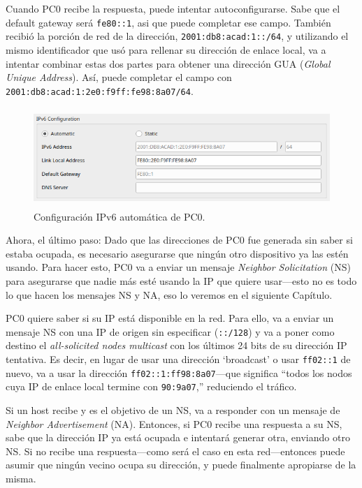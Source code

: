 \documentclass[a4paper,10pt]{corsage}
\newcommand{\ipaddress}[1]{\texttt{#1}}
\newcommand{\devname}[1]{\textsc{#1}}
\begin{document}
	Cuando \devname{PC0} recibe la respuesta, puede intentar autoconfigurarse.  Sabe que el default gateway será \ipaddress{fe80::1}, asi que puede completar ese campo.  También recibió la porción de red de la dirección, \ipaddress{2001:db8:acad:1::/64}, y utilizando el mismo identificador que usó para rellenar su dirección de enlace local, va a intentar combinar estas dos partes para obtener una dirección GUA (\textit{Global Unique Address}).  Así, puede completar el campo con \ipaddress{2001:db8:acad:1:2e0:f9ff:fe98:8a07/64}.

	\begin{figure}
		\centering
		\includegraphics[height=3.75cm]{host-automatic-conf}
		\caption{Configuración IPv6 automática de \devname{PC0}.}
	\end{figure}

	Ahora, el último paso:  Dado que las direcciones de \devname{PC0} fue generada sin saber si estaba ocupada, es necesario asegurarse que ningún otro dispositivo ya las estén usando.  Para hacer esto, \devname{PC0} va a enviar un mensaje \textit{Neighbor Solicitation} (NS) para asegurarse que nadie más esté usando la IP que quiere usar---esto no es todo lo que hacen los mensajes NS y NA, eso lo veremos en el siguiente Capítulo.

	\devname{PC0} quiere saber si su IP está disponible en la red.  Para ello, va a enviar un mensaje NS con una IP de origen sin especificar (\ipaddress{::/128}) y va a poner como destino el \textit{all-solicited nodes multicast} con los últimos 24 bits de su dirección IP tentativa.  Es decir, en lugar de usar una dirección `broadcast' o usar \ipaddress{ff02::1} de nuevo, va a usar la dirección \ipaddress{ff02::1:ff98:8a07}---que significa ``todos los nodos cuya IP de enlace local termine con \ipaddress{90:9a07},'' reduciendo el tráfico.

	Si un host recibe y es el objetivo de un NS, va a responder con un mensaje de \textit{Neighbor Advertisement} (NA).  Entonces, si \devname{PC0} recibe una respuesta a su NS, sabe que la dirección IP ya está ocupada e intentará generar otra, enviando otro NS.  Si no recibe una respuesta---como será el caso en esta red---entonces puede asumir que ningún vecino ocupa su dirección, y puede finalmente apropiarse de la misma.
\end{document}
